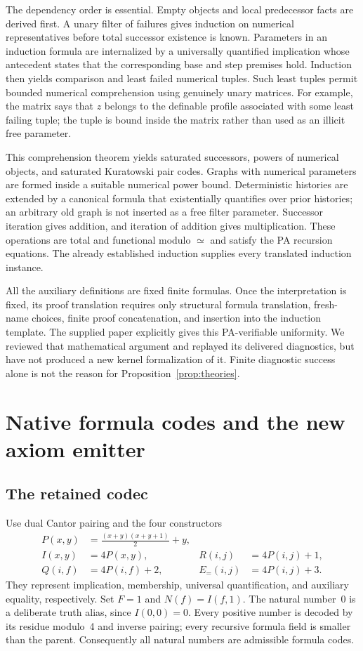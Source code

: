 \documentclass[11pt]{article}
\newcommand{\Eq}{\mathrel{\simeq}}
\theoremstyle{definition}\newtheorem{definition}[theorem]{Definition}
\begin{document}
The dependency order is essential. Empty objects and local predecessor
facts are derived first. A unary filter of failures gives induction on
numerical representatives before total successor existence is known.
Parameters in an induction formula are internalized by a universally
quantified implication whose antecedent states that the corresponding base
and step premises hold. Induction then yields comparison and least failed
numerical tuples. Such least tuples permit bounded numerical comprehension
using genuinely unary matrices. For example, the matrix says that $z$
belongs to the definable profile associated with some least failing tuple;
the tuple is bound inside the matrix rather than used as an illicit free
parameter.

This comprehension theorem yields saturated successors, powers of numerical
objects, and saturated Kuratowski pair codes. Graphs with numerical
parameters are formed inside a suitable numerical power bound.
Deterministic histories are extended by a canonical formula that existentially
quantifies over prior histories; an arbitrary old graph is not inserted as
a free filter parameter. Successor iteration gives addition, and iteration
of addition gives multiplication. These operations are total and functional
modulo $\Eq$ and satisfy the PA recursion equations. The already established
induction supplies every translated induction instance.

All the auxiliary definitions are fixed finite formulas. Once the
interpretation is fixed, its proof translation requires only structural
formula translation, fresh-name choices, finite proof concatenation, and
insertion into the induction template. The supplied paper explicitly gives
this PA-verifiable uniformity. We reviewed that mathematical argument and
replayed its delivered diagnostics, but have not produced a new kernel
formalization of it. Finite diagnostic success alone is not the reason for
Proposition~\ref{prop:theories}.

\section{Native formula codes and the new axiom emitter}

\subsection{The retained codec}

Use dual Cantor pairing and the four constructors
\begin{align*}
 P(x,y)&=\frac{(x+y)(x+y+1)}2+y,\\
 I(x,y)&=4P(x,y),& R(i,j)&=4P(i,j)+1,\\
 Q(i,f)&=4P(i,f)+2,& E_{=}(i,j)&=4P(i,j)+3.
\end{align*}
They represent implication, membership, universal quantification, and
auxiliary equality, respectively. Set $F=1$ and $N(f)=I(f,1)$.
The natural number~0 is a deliberate truth alias, since $I(0,0)=0$.
Every positive number is decoded by its residue modulo~4 and inverse pairing;
every recursive formula field is smaller than the parent. Consequently
all natural numbers are admissible formula codes.
\end{document}
